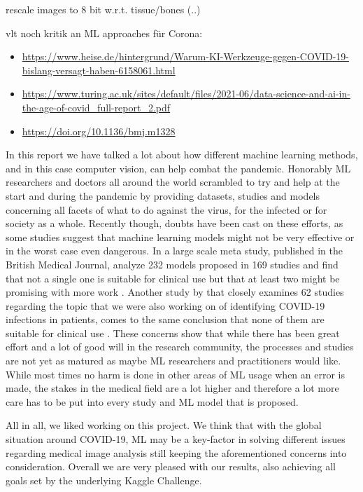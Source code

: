 rescale images to 8 bit w.r.t. tissue/bones (..)

vlt noch kritik an ML approaches für Corona:
 \begin{itemize}
 	\item \url{https://www.heise.de/hintergrund/Warum-KI-Werkzeuge-gegen-COVID-19-bislang-versagt-haben-6158061.html}
 	\item \url{https://www.turing.ac.uk/sites/default/files/2021-06/data-science-and-ai-in-the-age-of-covid_full-report_2.pdf}
 	\item \url{https://doi.org/10.1136/bmj.m1328}
 \end{itemize}

In this report we have talked a lot about how different machine learning methods, and in this case computer vision, can help combat the pandemic. Honorably ML researchers and doctors all around the world scrambled to try and help at the start and during the pandemic by providing datasets, studies and models concerning all facets of what to do against the virus, for the infected or for society as a whole. Recently though, doubts have been cast on these efforts, as some studies suggest that machine learning models might not be very effective or in the worst case even dangerous. In a large scale meta study, published in the British Medical Journal, \citeauthor{wynants_prediction_2020} analyze 232 models proposed in 169 studies and find that not a single one is suitable for clinical use but that at least two might be promising with more work \autocite{wynants_prediction_2020}. Another study by \citeauthor{aix-covnet_common_2021} that closely examines 62 studies regarding the topic that we were also working on of identifying COVID-19 infections in patients, comes to the same conclusion that none of them are suitable for clinical use \autocite{aix-covnet_common_2021}. These concerns show that while there has been great effort and a lot of good will in the research community, the processes and studies are not yet as matured as maybe ML researchers and practitioners would like. While most times no harm is done in other areas of ML usage when an error is made, the stakes in the medical field are a lot higher and therefore a lot more care has to be put into every study and ML model that is proposed.

All in all, we liked working on this project. We think that with the global situation around COVID-19, ML may be a key-factor in solving different issues regarding medical image analysis still keeping the aforementioned concerns into consideration. Overall we are very pleased with our results, also achieving all goals set by the underlying Kaggle Challenge.
